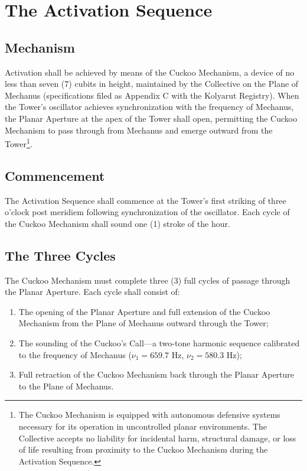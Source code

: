\documentclass[12pt]{article}
\begin{document}
\section{The Activation Sequence}

\subsection{Mechanism}
Activation shall be achieved by means of the Cuckoo Mechanism, a
device of no less than seven (7) cubits in height, maintained by the Collective on
the Plane of Mechanus (specifications filed as Appendix C with the
Kolyarut Registry). When the Tower's oscillator achieves synchronization
with the frequency of Mechanus, the Planar Aperture at the apex of
the Tower shall open, permitting the Cuckoo Mechanism to pass through
from Mechanus and emerge outward from the Tower\footnote{The
Cuckoo Mechanism is equipped with autonomous defensive systems
necessary for its operation in uncontrolled planar environments.
The Collective accepts no liability for incidental harm, structural
damage, or loss of life resulting from proximity to the Cuckoo
Mechanism during the Activation Sequence.}.

\subsection{Commencement}
The Activation Sequence shall commence at the Tower's first striking
of three o'clock post meridiem following synchronization of the
oscillator. Each cycle of the Cuckoo Mechanism shall sound one (1)
stroke of the hour.

\subsection{The Three Cycles}
The Cuckoo Mechanism must complete three (3) full cycles of passage
through the Planar Aperture. Each cycle shall consist of:

\begin{enumerate}[label=(\alph*)]
\item The opening of the Planar Aperture and full extension of the
Cuckoo Mechanism from the Plane of Mechanus outward through the Tower;
\item The sounding of the Cuckoo's Call---a two-tone harmonic sequence
calibrated to the frequency of Mechanus ($\nu_1 = 659.7$ Hz,
$\nu_2 = 580.3$ Hz);
\item Full retraction of the Cuckoo Mechanism back through the Planar
Aperture to the Plane of Mechanus.
\end{enumerate}
\end{document}

